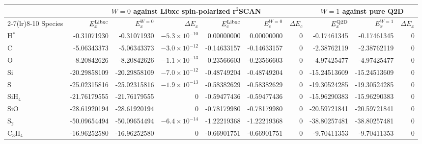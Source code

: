 \begin{tabular}{@{}l rrr rrr rrr@{}}
\toprule
 & \multicolumn{6}{c}{$W=0$ against Libxc spin-polarized r$^2$SCAN} & \multicolumn{3}{c}{$W=1$ against pure Q2D} \\
\cmidrule(lr){2-7}\cmidrule(lr){8-10}
Species & $E_x^{\rm Libxc}$ & $E_x^{W=0}$ & $\Delta E_x$ & $E_c^{\rm Libxc}$ & $E_c^{W=0}$ & $\Delta E_c$ & $E_x^{\rm Q2D}$ & $E_x^{W=1}$ & $\Delta E_x$ \\
\midrule
H$^{*}$ & -0.31071930 & -0.31071930 & \textcolor{green!50!black}{$-5.3\times10^{-10}$} & 0.00000000 & 0.00000000 & \textcolor{green!50!black}{0} & -0.17461345 & -0.17461345 & \textcolor{green!50!black}{0} \\
C & -5.06343373 & -5.06343373 & \textcolor{green!50!black}{$-3.0\times10^{-12}$} & -0.14633157 & -0.14633157 & \textcolor{green!50!black}{0} & -2.38762119 & -2.38762119 & \textcolor{green!50!black}{0} \\
O & -8.20842626 & -8.20842626 & \textcolor{green!50!black}{$-1.1\times10^{-13}$} & -0.23566603 & -0.23566603 & \textcolor{green!50!black}{0} & -4.97425477 & -4.97425477 & \textcolor{green!50!black}{0} \\
Si & -20.29858109 & -20.29858109 & \textcolor{green!50!black}{$-7.0\times10^{-12}$} & -0.48749204 & -0.48749204 & \textcolor{green!50!black}{0} & -15.24513609 & -15.24513609 & \textcolor{green!50!black}{0} \\
S & -25.02315816 & -25.02315816 & \textcolor{green!50!black}{$-1.9\times10^{-13}$} & -0.58382629 & -0.58382629 & \textcolor{green!50!black}{0} & -19.30524285 & -19.30524285 & \textcolor{green!50!black}{0} \\
SiH$_4$ & -21.76179555 & -21.76179555 & \textcolor{green!50!black}{0} & -0.59477436 & -0.59477436 & \textcolor{green!50!black}{0} & -15.96290383 & -15.96290383 & \textcolor{green!50!black}{0} \\
SiO & -28.61920194 & -28.61920194 & \textcolor{green!50!black}{0} & -0.78179980 & -0.78179980 & \textcolor{green!50!black}{0} & -20.59721841 & -20.59721841 & \textcolor{green!50!black}{0} \\
S$_2$ & -50.09654494 & -50.09654494 & \textcolor{green!50!black}{$-6.4\times10^{-14}$} & -1.22219368 & -1.22219368 & \textcolor{green!50!black}{0} & -38.80257481 & -38.80257481 & \textcolor{green!50!black}{0} \\
C$_3$H$_4$ & -16.96252580 & -16.96252580 & \textcolor{green!50!black}{0} & -0.66901751 & -0.66901751 & \textcolor{green!50!black}{0} & -9.70411353 & -9.70411353 & \textcolor{green!50!black}{0} \\

\end{tabular}
